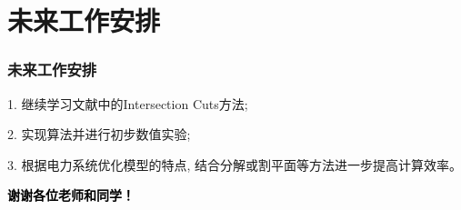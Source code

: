 \documentclass[10pt]{beamer}
\begin{document}
\section{未来工作安排}
\begin{frame}
	\frametitle{未来工作安排} 
	1. 继续学习文献中的Intersection Cuts方法;

	2. 实现算法并进行初步数值实验;

	3. 根据电力系统优化模型的特点, 结合分解或割平面等方法进一步提高计算效率。
\end{frame}

\begin{frame}
	\vspace{1em}
	\centering
	\textcolor{black}{\LARGE\bf 谢谢各位老师和同学！}

\end{frame}
\end{document}
